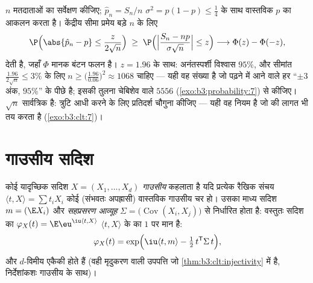 \begin{example}[विश्वास अंतराल, ईमानदारी से व्युत्पन्न]
\label{ex:b3:clt:confidence}
$n$  मतदाताओं का सर्वेक्षण कीजिए; $\hat p_n = S_n/n$ $\sigma^2 = p(1-p) \leq \frac14$ के साथ
वास्तविक $p$ का आकलन करता है। केंद्रीय सीमा प्रमेय बड़े $n$ के
लिए
\[
\P\Bigl(\abs{\hat p_n - p} \leq
\frac{z}{2\sqrt n}\Bigr)
\;\geq\; \P\Bigl(\Bigl|\frac{S_n - np}{\sigma\sqrt n}\Bigr|
\leq z\Bigr)
\longrightarrow \Phi(z) - \Phi(-z),
\]
देती है, जहाँ $\Phi$ मानक  बंटन फलन है। $z = 1.96$ के साथ:
अनंतस्पर्शी विश्वास $95\%$, और सीमांत $\frac{1.96}{2\sqrt n} \leq 3\%$ के लिए $n \geq
\bigl(\frac{1.96}{0.06}\bigr)^2 \approx 1068$ चाहिए ---
यही वह संख्या है जो पढ़ने में आने वाले हर ``$\pm3$ अंक, $95\%$'' के
पीछे है; इसकी तुलना चेबिशेव वाले $5556$ (\cref{exo:b3:probability:7}) से कीजिए। $\sqrt n$
सार्वत्रिक है: त्रुटि आधी करने के लिए प्रतिदर्श चौगुना कीजिए ---
यही वह नियम है जो  की लागत भी तय करता है (\cref{exo:b3:clt:7})।
\end{example}

\section{गाउसीय सदिश}

\begin{definition}\label{def:b3:clt:gaussianvector}
कोई यादृच्छिक सदिश $X = (X_1, \dots, X_d)$ \emph{गाउसीय} कहलाता
है यदि प्रत्येक रैखिक संचय $\langle t, X\rangle = \sum t_iX_i$ कोई (संभवतः अपह्रासी) वास्तविक
गाउसीय चर हो। उसका  माध्य सदिश $m = (\E X_i)$ और \emph{सहप्रसरण
आव्यूह} $\Sigma = \bigl(\operatorname{Cov}
(X_i, X_j)\bigr)$ से निर्धारित होता है: वस्तुतः सदिश का 
$\varphi_X(t) = \E\eu^{\iu\langle t, X\rangle}$ $\langle t, X\rangle$ के  का $1$ पर मान है:
\[
\varphi_X(t) = \exp\Bigl(\iu\langle t, m\rangle -
\tfrac12\,t^{\mathsf T}\Sigma\,t\Bigr),
\]
और $d$-विमीय  एकैकी होते हैं (वही मृदुकरण वाली
उपपत्ति जो \cref{thm:b3:clt:injectivity} में है, निर्देशांकशः गाउसीय के साथ)।
\end{definition}

